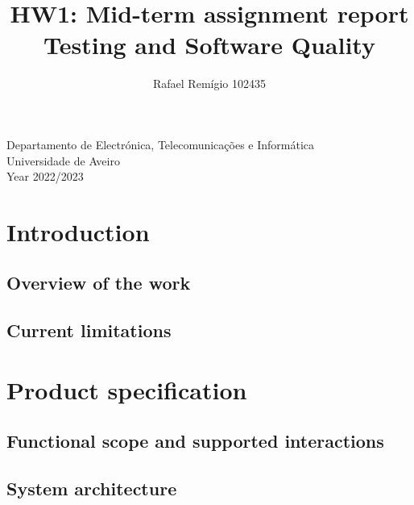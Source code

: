 \documentclass[12pt]{article}
\begin{document}
\begin{titlepage}

\title{%
  HW1: Mid-term assignment report\\
  \large  Testing and Software Quality\\}

\author{Rafael Remígio 102435}

\maketitle

\vfill
\begin{center}

	Departamento de Electrónica, Telecomunicações e Informática\\
       Universidade de Aveiro\\ Year 2022/2023
\end{center}



\end{titlepage}

\tableofcontents


\section{Introduction}

\subsection{Overview of the work} 


\subsection{Current limitations} 


\section{Product specification}


\subsection{Functional scope and supported interactions }

\subsection{System architecture}
\end{document}
